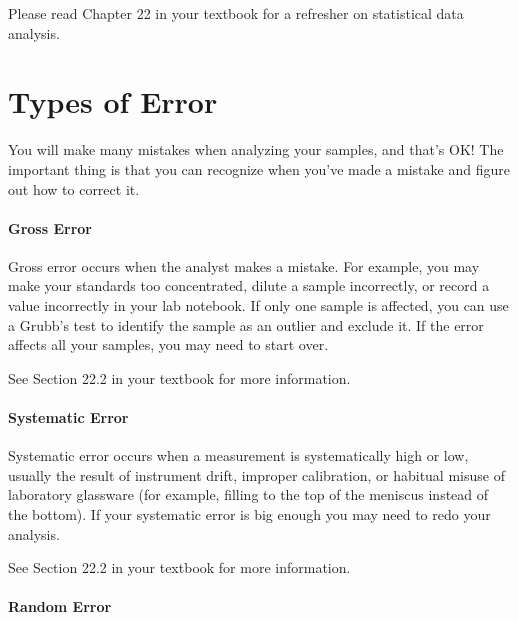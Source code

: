 \documentclass[]{tufte-book}
\begin{document}
Please read Chapter 22 in your textbook for a refresher on statistical data analysis.

\hypertarget{types-of-error}{%
\section*{Types of Error}\label{types-of-error}}

You will make many mistakes when analyzing your samples, and that's OK! The important thing is that you can recognize when you've made a mistake and figure out how to correct it.

\hypertarget{gross-error}{%
\paragraph{\texorpdfstring{\textbf{Gross Error}}{Gross Error}}\label{gross-error}}

Gross error occurs when the analyst makes a mistake. For example, you may make your standards too concentrated, dilute a sample incorrectly, or record a value incorrectly in your lab notebook. If only one sample is affected, you can use a Grubb's test to identify the sample as an outlier and exclude it. If the error affects all your samples, you may need to start over.

See Section 22.2 in your textbook for more information.

\hypertarget{systematic-error}{%
\paragraph{\texorpdfstring{\textbf{Systematic Error}}{Systematic Error}}\label{systematic-error}}

Systematic error occurs when a measurement is systematically high or low, usually the result of instrument drift, improper calibration, or habitual misuse of laboratory glassware (for example, filling to the top of the meniscus instead of the bottom). If your systematic error is big enough you may need to redo your analysis.

See Section 22.2 in your textbook for more information.

\hypertarget{random-error}{%
\paragraph{\texorpdfstring{\textbf{Random Error}}{Random Error}}\label{random-error}}
\end{document}
